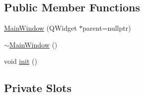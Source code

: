 \subsection*{Public Member Functions}
\begin{DoxyCompactItemize}
\item 
\mbox{\hyperlink{class_main_window_a996c5a2b6f77944776856f08ec30858d}{Main\+Window}} (Q\+Widget $\ast$parent=nullptr)
\item 
\mbox{\hyperlink{class_main_window_ae98d00a93bc118200eeef9f9bba1dba7}{$\sim$\+Main\+Window}} ()
\item 
void \mbox{\hyperlink{class_main_window_a671e7e5b0a3a7a3fb1cf44c5c8377952}{init}} ()
\end{DoxyCompactItemize}
\subsection*{Private Slots}
